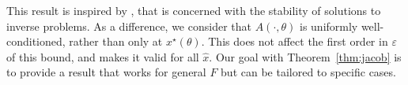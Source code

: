 \documentclass{article}
\makeatletter
\newcommand{\qberthet}[1]{\textcolor{red}{\texttt{qberthet@:} #1}}
\newcommand{\jpvert}[1]{\textcolor{olive}{\texttt{jpvert:} #1}}
\makeatother
\begin{document}
This result is inspired by \cite[Theorem 7.2]{Higham2002Accuracy}, that is
concerned with the stability of solutions to inverse problems. As a difference, 
we consider
that $A(\cdot, \theta)$ is uniformly well-conditioned, rather than only at
$x^\star(\theta)$. This does not affect the first order in $\varepsilon$ of this
bound, and makes it valid for all $\hat x$. 
Our goal with Theorem~\ref{thm:jacob} is to provide a result
that works for general $F$ but can be tailored to specific cases. 
\end{document}
